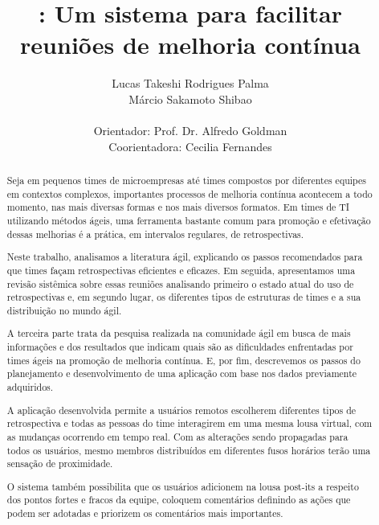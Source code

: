\documentclass[titlepage, 12pt]{article}
\title{\suricato: Um sistema para facilitar reuniões de melhoria contínua}
\author{Lucas Takeshi Rodrigues Palma\\Márcio Sakamoto Shibao\\ \\Orientador: Prof. Dr. Alfredo Goldman\\Coorientadora: Cecilia Fernandes}
\begin{document}
	

\maketitle

\begin{abstract}
Seja em pequenos times de microempresas até times compostos por diferentes equipes em contextos complexos, importantes processos de melhoria contínua acontecem a todo momento, nas mais diversas formas e nos mais diversos formatos. Em times de TI utilizando métodos ágeis, uma ferramenta bastante comum para promoção e efetivação dessas melhorias é a prática, em intervalos regulares, de retrospectivas.

Neste trabalho, analisamos a literatura ágil, explicando os passos recomendados para que times façam retrospectivas eficientes e eficazes. Em seguida, apresentamos uma revisão sistêmica sobre essas reuniões analisando primeiro o estado atual do uso de retrospectivas e, em segundo lugar, os diferentes tipos de estruturas de times e a sua distribuição no mundo ágil.

A terceira parte trata da pesquisa realizada na comunidade ágil em busca de mais informações e dos resultados que indicam quais são as dificuldades enfrentadas por times ágeis na promoção de melhoria contínua. E, por fim, descrevemos os passos do planejamento e desenvolvimento de uma aplicação com base nos dados previamente adquiridos.

A aplicação desenvolvida permite a usuários remotos escolherem diferentes tipos de retrospectiva e todas as pessoas do time interagirem em uma mesma lousa virtual, com as mudanças ocorrendo em tempo real. Com as alterações sendo propagadas para todos os usuários, mesmo membros distribuídos em diferentes fusos horários terão uma sensação de
proximidade.

O sistema também possibilita que os usuários adicionem na lousa post-its a respeito dos pontos fortes e fracos da equipe, coloquem comentários definindo as ações que podem ser adotadas e priorizem os comentários mais importantes.
 
\end{abstract}
\newpage
\end{document}
